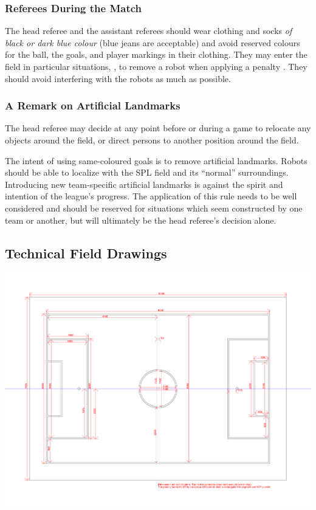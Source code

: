 \subsubsection{Referees During the Match}

The head referee and the assistant referees should wear clothing and socks \emph{of black or dark blue colour} (blue jeans are acceptable) and avoid reserved colours for the ball, the goals, and player markings in their clothing. They may enter the field in particular situations, \eg, to remove a robot when applying a penalty . They should avoid interfering with the robots as much as possible.

\subsubsection{A Remark on Artificial Landmarks}
\label{sec:judgment:landmarks}

The head referee may decide at any point before or during a game to relocate any objects around the field, or direct persons to another position around the field.

The intent of using same-coloured goals is to remove artificial landmarks.
Robots should be able to localize with the SPL field and its ``normal'' surroundings.
Introducing new team-specific artificial landmarks is against the spirit and intention of the league's progress.
The application of this rule needs to be well considered and should be reserved for situations which seem constructed by one team or another, but will ultimately be the head referee's decision alone.

\newpage

\subsection{Technical Field Drawings}
\label{apx:technical-drawing}
\centerline{\includegraphics[angle=90,origin=c,width=\columnwidth]{figs/fieldDimensions2020_technical.pdf}}

